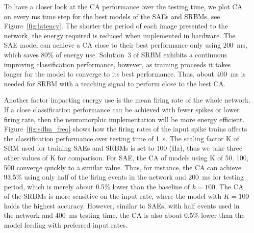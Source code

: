 To have a closer look at the CA performance over the testing time, we plot CA on every ms time step for the best models of the SAEs and SRBMs, see Figure~\ref{fig:latency}.
The shorter the period of each image presented to the network, the energy required is reduced when implemented in hardware.
The SAE model can achieve a CA close to their best performance only using 200~ms, which saves 80\% of energy use.
Solution~3 of SRBM exhibits a continuous improving classification performance, however, as training proceeds it takes longer for the model to converge to its best performance.
Thus, about 400~ms is needed for SRBM with a teaching signal to perform close to the best CA.

Another factor impacting energy use is the mean firing rate of the whole network.
If a close classification performance can be achieved with fewer spikes or lower firing rate, then the neuromorphic implementation will be more energy efficient.
Figure~\ref{fig:sdlm_freq} shows how the firing rates of the input spike trains affects the classification performance over testing time of 1~s.
The scaling factor K of SRM used for training SAEs and SRBMs is set to 100 (Hz), thus we take three other values of K for comparison.
For SAE, the CA of models using K of 50, 100, 500 converge quickly to a similar value.
Thus, for instance, the CA can achieve 93.5\% using only half of the firing events in the network and 200~ms for testing period, which is merely about 0.5\% lower than the baseline of $k=100$.
The CA of the SRBMs is more sensitive on the input rate, where the model with $K=100$ holds the highest accuracy.
However, similar to SAEs, with half events used in the network and 400~ms testing time, the CA is also about 0.5\% lower than the model feeding with preferred input rates.

